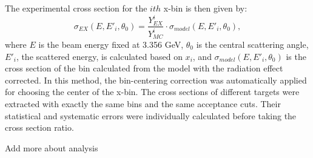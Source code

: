 	The experimental cross section for the $ith$ x-bin is then given by:
	\begin{equation}
	\sigma_{EX}(E, E'_{i},\theta_{0}) = \frac{Y^{i}_{EX}}{Y^{i}_{MC}}\cdot\sigma_{model}(E, E'_{i},\theta_{0}),
	\end{equation}
	where $E$ is the beam energy fixed at 3.356 GeV, $\theta_{0}$ is the central scattering angle, $E'_{i}$, the scattered energy, is calculated based on $x_{i}$, and $\sigma_{model}(E, E'_{i},\theta_{0})$ is the cross section of the bin calculated from the model with the radiation effect corrected.  In this method, the bin-centering correction was automatically applied for choosing the center of the x-bin. The cross sections of different targets were extracted with exactly the same bins and the same acceptance cuts. Their statistical and systematic errors were individually calculated before taking the cross section ratio.

    Add more about analysis
